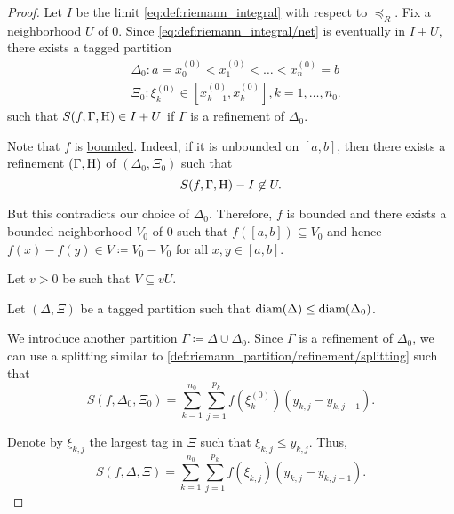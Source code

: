 \begin{proof}
   Let \( I \) be the limit \eqref{eq:def:riemann_integral} with respect to \( \preceq_R \). Fix a neighborhood \( U \) of \( 0 \). Since \eqref{eq:def:riemann_integral/net} is eventually in \( I + U \), there exists a tagged partition
  \begin{equation}\label{eq:def:riemann_integral/tagged_zero}
    \begin{aligned}
      &\Delta_0: a = x_0^{(0)} < x_1^{(0)} < \ldots < x_n^{(0)} = b \\
      &\Xi_0: \xi_k^{(0)} \in [x_{k-1}^{(0)}, x_k^{(0)}], k = 1, \ldots, n_0.
    \end{aligned}
  \end{equation}
  such that \( S(f, \Gamma, \operatorname{H}) \in I + U \) if \( \Gamma \) is a refinement of \( \Delta_0 \).

  Note that \( f \) is \hyperref[def:bounded_function/bounded]{bounded}. Indeed, if it is unbounded on \( [a, b] \), then there exists a refinement \( (\Gamma, \operatorname{H}) \) of \( (\Delta_0, \Xi_0) \) such that
  \begin{equation*}
    S(f, \Gamma, \operatorname{H}) - I \not\in U.
  \end{equation*}

  But this contradicts our choice of \( \Delta_0 \). Therefore, \( f \) is bounded and there exists a bounded neighborhood \( V_0 \) of \( 0 \) such that \( f([a, b]) \subseteq V_0 \) and hence \( f(x) - f(y) \in V \coloneqq V_0 - V_0 \) for all \( x, y \in [a, b] \).

  Let  \( v > 0 \) be such that \( V \subseteq vU \).

  Let \( (\Delta, \Xi) \) be a tagged partition such that \( \operatorname{diam}(\Delta) \leq \operatorname{diam}(\Delta_0) \).

  We introduce another partition \( \Gamma \coloneqq \Delta \cup \Delta_0 \). Since \( \Gamma \) is a refinement of \( \Delta_0 \), we can use a splitting similar to \eqref{def:riemann_partition/refinement/splitting} such that
  \begin{equation}\label{def:riemann_partition/subdiameter_splitting}
    S(f, \Delta_0, \Xi_0) = \sum_{k=1}^{n_0} \sum_{j=1}^{p_k} f(\xi^{(0)}_k) (y_{k,j} - y_{k,j-1}).
  \end{equation}

  Denote by \( \xi_{k,j} \) the largest tag in \( \Xi \) such that \( \xi_{k,j} \leq y_{k,j} \). Thus,
  \begin{equation*}
    S(f, \Delta, \Xi) = \sum_{k=1}^{n_0} \sum_{j=1}^{p_k} f(\xi_{k,j}) (y_{k,j} - y_{k,j-1}).
  \end{equation*}


\end{proof}
